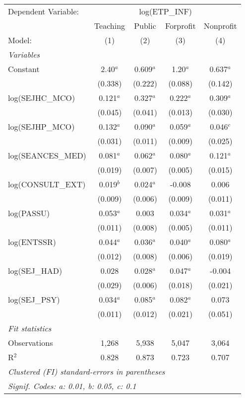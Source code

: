 
\begingroup
\centering
\begin{tabular}{lcccc}
   \tabularnewline \midrule \midrule
   Dependent Variable: & \multicolumn{4}{c}{log(ETP\_INF)}\\
                      & Teaching    & Public      & Forprofit   & Nonprofit \\   
   Model:             & (1)         & (2)         & (3)         & (4)\\  
   \midrule
   \emph{Variables}\\
   Constant           & 2.40$^{a}$  & 0.609$^{a}$ & 1.20$^{a}$  & 0.637$^{a}$\\   
                      & (0.338)     & (0.222)     & (0.088)     & (0.142)\\   
   log(SEJHC\_MCO)    & 0.121$^{a}$ & 0.327$^{a}$ & 0.222$^{a}$ & 0.309$^{a}$\\   
                      & (0.045)     & (0.041)     & (0.013)     & (0.030)\\   
   log(SEJHP\_MCO)    & 0.132$^{a}$ & 0.090$^{a}$ & 0.059$^{a}$ & 0.046$^{c}$\\   
                      & (0.031)     & (0.011)     & (0.009)     & (0.025)\\   
   log(SEANCES\_MED)  & 0.081$^{a}$ & 0.062$^{a}$ & 0.080$^{a}$ & 0.121$^{a}$\\   
                      & (0.019)     & (0.007)     & (0.005)     & (0.015)\\   
   log(CONSULT\_EXT)  & 0.019$^{b}$ & 0.024$^{a}$ & -0.008      & 0.006\\   
                      & (0.009)     & (0.006)     & (0.009)     & (0.011)\\   
   log(PASSU)         & 0.053$^{a}$ & 0.003       & 0.034$^{a}$ & 0.031$^{a}$\\   
                      & (0.011)     & (0.008)     & (0.005)     & (0.011)\\   
   log(ENTSSR)        & 0.044$^{a}$ & 0.036$^{a}$ & 0.040$^{a}$ & 0.080$^{a}$\\   
                      & (0.012)     & (0.008)     & (0.006)     & (0.019)\\   
   log(SEJ\_HAD)      & 0.028       & 0.028$^{a}$ & 0.047$^{a}$ & -0.004\\   
                      & (0.029)     & (0.006)     & (0.018)     & (0.021)\\   
   log(SEJ\_PSY)      & 0.034$^{a}$ & 0.085$^{a}$ & 0.082$^{a}$ & 0.073\\   
                      & (0.011)     & (0.012)     & (0.021)     & (0.051)\\   
   \midrule
   \emph{Fit statistics}\\
   Observations       & 1,268       & 5,938       & 5,047       & 3,064\\  
   R$^2$              & 0.828       & 0.873       & 0.723       & 0.707\\  
   \midrule \midrule
   \multicolumn{5}{l}{\emph{Clustered (FI) standard-errors in parentheses}}\\
   \multicolumn{5}{l}{\emph{Signif. Codes: a: 0.01, b: 0.05, c: 0.1}}\\
\end{tabular}
\par\endgroup


